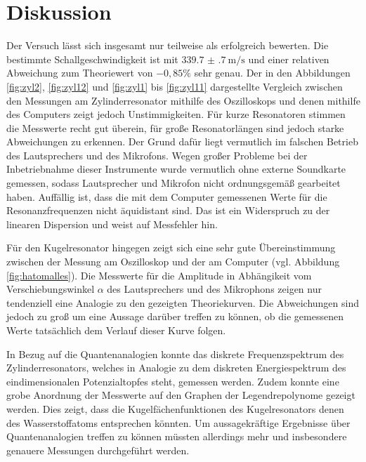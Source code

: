 \section{Diskussion}
\label{sec:Diskussion}

Der Versuch lässt sich insgesamt nur teilweise als erfolgreich bewerten. Die bestimmte
Schallgeschwindigkeit ist mit $\SI{339.7(7)}{\meter\per\second}$ und einer relativen Abweichung zum Theoriewert
von $-0{,}85\%$ sehr genau.
Der in den Abbildungen \ref{fig:zyl2}, \ref{fig:zyl12} und \ref{fig:zyl1} bis \ref{fig:zyl11}
dargestellte Vergleich zwischen den Messungen am Zylinderresonator mithilfe des Oszilloskops und denen mithilfe des
Computers zeigt jedoch Unstimmigkeiten. Für kurze Resonatoren stimmen die Messwerte recht
gut überein, für große Resonatorlängen sind jedoch starke Abweichungen zu erkennen. Der Grund
dafür liegt vermutlich im falschen Betrieb des Lautsprechers und des Mikrofons. Wegen großer
Probleme bei der Inbetriebnahme dieser Instrumente wurde vermutlich ohne externe Soundkarte
gemessen, sodass Lautsprecher und Mikrofon nicht ordnungsgemäß gearbeitet haben.
Auffällig ist, dass die mit dem Computer gemessenen Werte für die Resonanzfrequenzen
nicht äquidistant sind. Das ist ein Widerspruch zu der linearen Dispersion und weist auf
Messfehler hin.

Für den Kugelresonator hingegen zeigt sich eine sehr gute Übereinstimmung zwischen der Messung
am Oszilloskop und der am Computer (vgl. Abbildung \ref{fig:hatomalles}). Die Messwerte für die
Amplitude in Abhängikeit vom Verschiebungswinkel $\alpha$ des Lautsprechers und des Mikrophons
zeigen nur tendenziell eine Analogie zu den gezeigten Theoriekurven. Die Abweichungen sind
jedoch zu groß um eine Aussage darüber treffen zu können, ob die gemessenen Werte
tatsächlich dem Verlauf dieser Kurve folgen.

In Bezug auf die Quantenanalogien konnte das diskrete Frequenzspektrum des Zylinderresonators, welches in Analogie zu dem diskreten Energiespektrum des eindimensionalen Potenzialtopfes steht, gemessen werden. Zudem konnte
eine grobe Anordnung der Messwerte auf den Graphen der Legendrepolynome gezeigt werden. Dies zeigt, dass die Kugelfächenfunktionen des Kugelresonators denen des
Wasserstoffatoms entsprechen könnten. Um aussagekräftige Ergebnisse über Quantenanalogien treffen zu können müssten allerdings mehr und insbesondere genauere Messungen durchgeführt werden.
